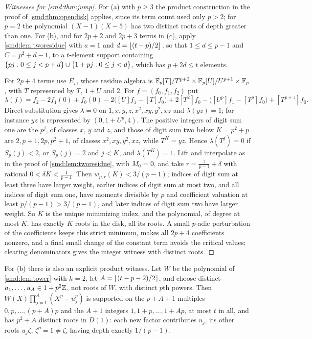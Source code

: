 \begin{proof}[Witnesses for \cref{smd:thm:jump}]
For (a) with $p\ge3$ the product construction in the proof of \cref{smd:thm:opendisk} applies,
since its term count used only $p>2$; for $p=2$ the polynomial $(X-1)(X-5)$ has two distinct roots
of depth greater than one. For (b), and for $2p+2$ and $2p+3$ terms in (c), apply
\cref{smd:lem:tworesidue} with $a=1$ and $d=\lfloor(t-p)/2\rfloor$, so that $1\le d\le p-1$ and
$C=p^2+d-1$, to a $t$-element support containing
$\{pj : 0\le j<p+d\}\cup\{1+pj : 0\le j<d\}$, which has $p+2d\le t$ elements.

For $2p+4$ terms use $E_\star$, whose residue algebra is
$\mathbb{F}_p[T]/T^{p+2}\times\mathbb{F}_p[U]/U^{p+1}\times\mathbb{F}_p$, with $T$ represented by $T$, $1+U$ and $2$. For
$f=(f_0,f_1,f_2)$ put
\[
 \lambda(f)=f_2-2f_1(0)+f_0(0)-2\bigl([U]f_1-[T]f_0\bigr)+2[T^2]f_0
 -\bigl([U^p]f_1-[T^p]f_0\bigr)+[T^{p+1}]f_0 .
\]
Direct substitution gives $\lambda=0$ on $1,x,y,z,x^2,xy,y^2,xz$ and $\lambda(yz)=1$; for instance
$yz$ is represented by $(0,1+U^p,4)$. The positive integers of digit sum one are the $p^j$, of
classes $x$, $y$ and $z$, and those of digit sum two below $K=p^2+p$ are $2,p+1,2p,p^2+1$, of
classes $x^2,xy,y^2,xz$, while $T^K=yz$. Hence $\lambda(T^j)=0$ if $S_p(j)<2$, or $S_p(j)=2$ and
$j<K$, and $\lambda(T^K)=1$. Lift and interpolate as in the proof of \cref{smd:lem:tworesidue},
with $M_0=0$, and take $r=\frac1{p-1}+\delta$ with rational $0<\delta K<\frac1{p-1}$. Then
$w_{p,r}(K)<3/(p-1)$; indices of digit sum at least three have larger weight, earlier indices of
digit sum at most two, and all indices of digit sum one, have moments divisible by $p$ and
coefficient valuation at least $p/(p-1)>3/(p-1)$, and later indices of digit sum two have larger
weight. So $K$ is the unique minimizing index, and the polynomial, of degree at most $K$, has
exactly $K$ roots in the disk, all its roots. A small $p$-adic perturbation of the coefficients
keeps this strict minimum, makes all $2p+4$ coefficients nonzero, and a final small change of the
constant term avoids the critical values; clearing denominators gives the integer witness with
distinct roots.
\end{proof}

For (b) there is also an explicit product witness. Let $W$ be the polynomial of
\cref{smd:lem:tower} with $h=2$, let $A=\lfloor(t-p-2)/2\rfloor$, and choose distinct
$u_1,\dots,u_A\in1+p^2\mathbb{Z}$, not roots of $W$, with distinct $p$th powers. Then
$W(X)\prod_{j=1}^A(X^p-u_j^p)$ is supported on the $p+A+1$ multiples $0,p,\dots,(p+A)p$ and the
$A+1$ integers $1,1+p,\dots,1+Ap$, at most $t$ in all, and has $p^2+A$ distinct roots in $D(1)$:
each new factor contributes $u_j$, its other roots $u_j\zeta$, $\zeta^p=1\ne\zeta$, having depth
exactly $1/(p-1)$.

